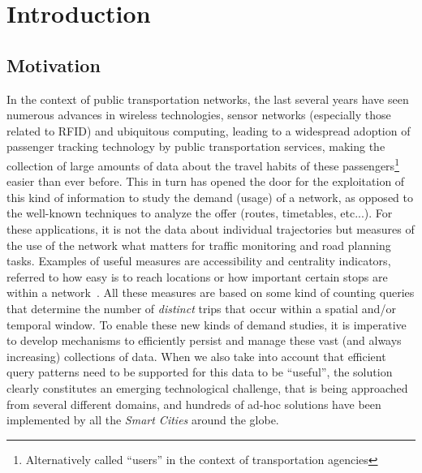 \documentclass[a4paper,10pt,twoside]{book}
\begin{document}
\pagestyle{fancy}\fancyfoot{}\fancyhead{}
\fancyhead[LO]{\slshape\nouppercase{\rightmark}}
\fancyhead[RE]{\slshape\nouppercase{\leftmark}}
\fancyhead[RO,LE]{\slshape \thepage}

\frontmatter




\mainmatter

\chapter{Introduction}
	\section{Motivation}
	In the context of public transportation networks, the last several years have seen numerous advances in wireless technologies, sensor networks (especially those related to RFID) and ubiquitous computing, leading to a widespread adoption of passenger tracking technology by public transportation services, making the collection of large amounts of data about the travel habits of these passengers\footnote{Alternatively called ``users'' in the context of transportation agencies} easier than ever before.
	This in turn has opened the door for the exploitation of this kind of information to study the demand (usage) of a network, as opposed to the well-known techniques to analyze the offer (routes, timetables, etc...). 
	For these applications, it is not the data about individual trajectories but measures of the use of the network what matters for traffic monitoring and road planning tasks. Examples of useful measures are  accessibility and centrality indicators, referred to how easy  is to reach locations or how important certain stops are within a network~\cite{Morency2007193, El-Geneidy2011, Wang2015335}. All these measures are based on some kind of counting queries that determine the number of \textit{distinct} trips that occur within a spatial and/or temporal window.
	To enable these new kinds of demand studies, it is imperative to develop mechanisms to efficiently persist and manage these vast (and always increasing) collections of data. When we also take into account that efficient query patterns need to be supported for this data to be ``useful'', the solution clearly constitutes an emerging technological challenge, that is being approached from several different domains, and hundreds of ad-hoc solutions have been implemented by all the \textit{Smart Cities} around the globe.
	
\end{document}
